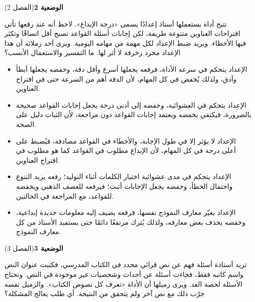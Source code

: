 \documentclass[11pt,a4paper]{article}
\begin{document}
\par\vspace{6pt}
\noindent
{\large\khatt\textbf{الوضعية 2}}\hfill{\small(الفصل 2)}\par\nopagebreak\vspace{3pt}
\setlength{\fboxsep}{7pt}\colorbox{gray!10}{\parbox{\dimexpr\linewidth-14pt}{تتيح أداة يستعملها أستاذ إعدادًا يسمى «درجة الإبداع». لاحظ أنه عند رفعها تأتي اقتراحات العناوين متنوعة طريفة، لكن إجابات أسئلة القواعد تصبح أقل اتساقًا وتكثر فيها الأخطاء. ويريد ضبط الإعداد لكل مهمة من مهامه اليومية. ويرى أحد زملائه أن هذا الإعداد مجرد زخرفة لا أثر لها. ما التفسير والاستعمال الأنسب؟}}\par\nopagebreak
\begin{itemize}[leftmargin=1.0cm, labelsep=6pt, itemsep=3pt, topsep=4pt, parsep=0pt]
  \item[\textbf{أ)}] الإعداد يتحكم في سرعة الأداة، فرفعه يجعلها أسرع وأقل دقة، وخفضه يجعلها أبطأ وأدق، ولذلك يُخفض في كل المهام، لأن الدقة أهم من السرعة حتى في اقتراح العناوين.
  \item[\textbf{ب)}] الإعداد يتحكم في العشوائية، وخفضه إلى أدنى درجة يجعل إجابات القواعد صحيحة بالضرورة، فيكتفي بخفضه ويعتمد إجابات القواعد دون مراجعة، لأن الثبات دليل على الصحة.
  \item[\textbf{ج)}] الإعداد لا يؤثر إلا في طول الإجابة، والأخطاء في القواعد مصادفة، فيُضبط على أعلى درجة في كل المهام، لأن الإبداع مطلوب في القواعد كما هو مطلوب في اقتراح العناوين.
  \item[\textbf{د)}] الإعداد يتحكم في مدى عشوائية اختيار الكلمات أثناء التوليد؛ رفعه يزيد التنوع واحتمال الخطأ، وخفضه يجعل الإجابات أثبت؛ فيرفعه للعصف الذهني ويخفضه للقواعد، مع المراجعة في الحالتين.
  \item[\textbf{هـ)}] الإعداد يغيّر معارف النموذج نفسها، فرفعه يضيف إليه معلومات جديدة إبداعية، وخفضه يحذف بعض معارفه، ولذلك يُترك مرتفعًا دائمًا حتى يستفيد الأستاذ من كل معارف النموذج.
\end{itemize}
\par\vspace{6pt}
\noindent
{\large\khatt\textbf{الوضعية 3}}\hfill{\small(الفصل 3)}\par\nopagebreak\vspace{3pt}
\setlength{\fboxsep}{7pt}\colorbox{gray!10}{\parbox{\dimexpr\linewidth-14pt}{تريد أستاذة أسئلة فهم عن نص قرائي محدد في الكتاب المدرسي، فكتبت عنوان النص واسم كاتبه فقط، فجاءت أسئلة عن أحداث وشخصيات غير موجودة في النص. وتحتاج الأسئلة لحصة الغد. ويرى زميلها أن الأداة «تعرف كل نصوص الكتاب». والزميل نفسه جرّب ذلك مع نص آخر ولم يتحقق من النتيجة. أي طلب يعالج المشكلة؟}}\par\nopagebreak
\end{document}
